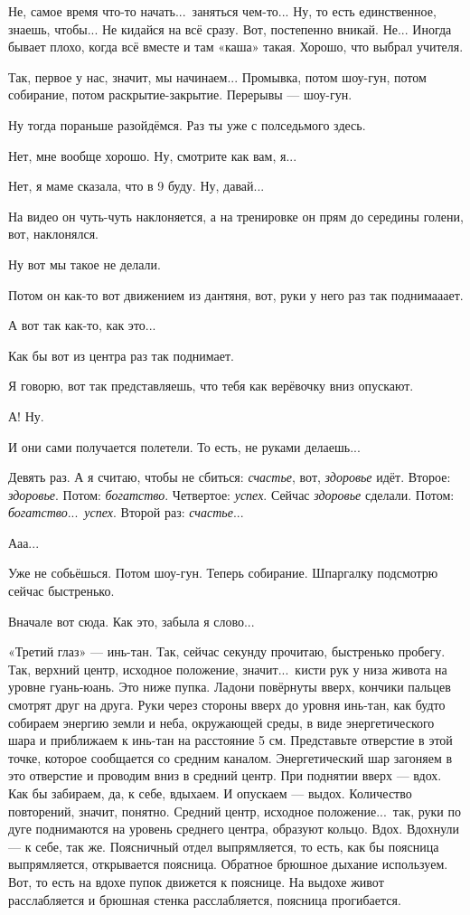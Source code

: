 \M
Не, самое время что-то начать...\ заняться чем-то...
Ну, то есть единственное, знаешь, чтобы... Не кидайся на всё сразу.
Вот, постепенно вникай. Не... Иногда
бывает плохо, когда всё вместе и там «каша» такая. Хорошо, что выбрал учителя.

\I
Так, первое у нас,
значит, мы начинаем... Промывка, потом
шоу-гун, потом собирание, потом раскрытие-закрытие. Перерывы --- шоу-гун.

\M
Ну тогда пораньше разойдёмся. Раз ты уже с полседьмого здесь.

\I
Нет, мне вообще хорошо. Ну, смотрите как вам, я...

\M
Нет, я маме сказала, что в 9 буду. Ну, давай...

\I
На видео он чуть-чуть наклоняется, а на тренировке он прям до середины голени, вот, наклонялся.

\M
Ну вот мы такое
не делали.

\I
Потом он как-то вот движением из дантяня, вот, руки у него {\csc раз} так поднимааает.

\M
А вот так как-то, как это...

\I
Как бы вот из центра {\csc раз} так поднимает.

\M
Я говорю, вот так представляешь, что тебя как верёвочку вниз опускают.

\I
А! Ну.

\M
И они сами получается полетели.
То есть, не руками делаешь...

\I
Девять раз. А я считаю, чтобы
не сбиться: {\it счастье}, вот, {\it здоровье\/} идёт. Второе: {\it здоровье}.
Потом: {\it богатство}. Четвертое:
{\it успех}.
Сейчас {\it здоровье\/} сделали. Потом: {\it богатство}...\
{\it успех}. Второй раз: {\it счастье}...

\M
Ааа...

\I
Уже не собьёшься.
Потом шоу-гун.
Теперь собирание. Шпаргалку подсмотрю сейчас быстренько.

\M
Вначале вот сюда. Как это, забыла я слово...

\I
«Третий глаз» --- инь-тан. Так, сейчас секунду прочитаю, быстренько пробегу.
Так, верхний центр, исходное положение, значит...\ кисти рук у низа
живота на уровне гуань-юань. Это ниже пупка.
Ладони повёрнуты вверх, кончики пальцев смотрят друг на друга.
Руки через стороны вверх до уровня инь-тан, как будто собираем энергию земли и неба,
окружающей среды, в виде энергетического шара и приближаем к инь-тан на расстояние 5 см.
Представьте отверстие в
этой точке, которое сообщается со средним каналом.
Энергетический шар загоняем в это отверстие и проводим вниз в средний центр.
При поднятии вверх --- вдох.
Как бы забираем, да, к себе, вдыхаем. И опускаем --- выдох.
Количество повторений, значит, понятно.
Средний центр, исходное положение...\ так, руки по дуге поднимаются на уровень среднего центра,
образуют кольцо. Вдох. Вдохнули --- к себе, так же.
Поясничный отдел выпрямляется, то есть, как бы поясница выпрямляется, открывается поясница.
Обратное брюшное дыхание используем.
Вот, то есть на вдохе пупок движется к пояснице.
На выдохе живот расслабляется
и брюшная стенка
расслабляется, поясница прогибается.

